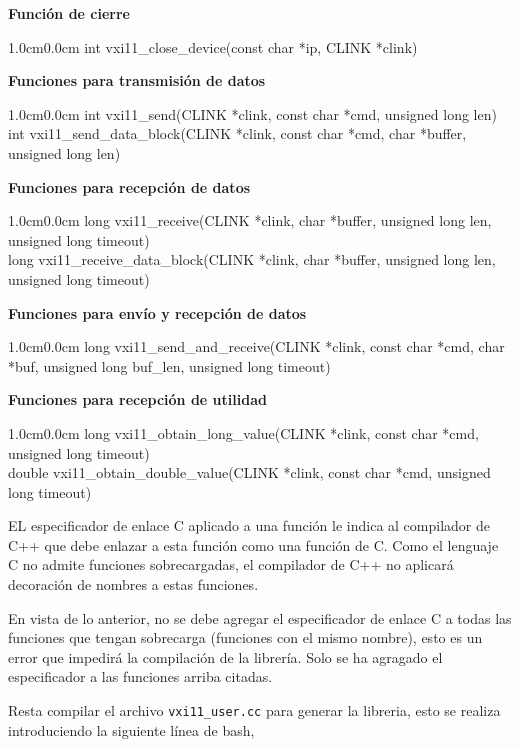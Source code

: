 \documentclass[paper=letter,oneside,fontsize=11pt, parskip=full]{scrartcl}
\newenvironment{code}
	{\begin{adjustwidth}{1.0cm}{0.0cm}\ttfamily}
	{\end{adjustwidth}}
\begin{document}
	\textbf{Función de cierre}
	\begin{code}
		int vxi11\_close\_device(const char *ip, CLINK *clink)
	\end{code}

	\textbf{Funciones para transmisión de datos}
	\begin{code}
		int	vxi11\_send(CLINK *clink, const char *cmd, unsigned long len) \\		
		int	vxi11\_send\_data\_block(CLINK *clink, const char *cmd, char *buffer, unsigned long len) 		 		
	\end{code}

	\textbf{Funciones para recepción de datos}
	\begin{code}
		long vxi11\_receive(CLINK *clink, char *buffer, unsigned long len, unsigned long timeout) \\	
		long vxi11\_receive\_data\_block(CLINK *clink, char *buffer, unsigned long len, unsigned long timeout) 			
	\end{code}		

	\textbf{Funciones para envío y recepción de datos}
	\begin{code}
		long vxi11\_send\_and\_receive(CLINK *clink, const char *cmd, char *buf, unsigned long buf\_len, unsigned long timeout) 
	\end{code}	
		
	\textbf{Funciones para recepción de utilidad}
	\begin{code}
		long vxi11\_obtain\_long\_value(CLINK *clink, const char *cmd, unsigned long timeout) \\
		double vxi11\_obtain\_double\_value(CLINK *clink, const char *cmd, unsigned long timeout)
	\end{code}

	EL especificador de enlace C aplicado a una función le indica al compilador de C++ que debe enlazar a esta función como una función de C. Como el lenguaje C no admite funciones sobrecargadas, el compilador de C++ no aplicará decoración de nombres a estas funciones. 
	
	En vista de lo anterior, no se debe agregar el especificador de enlace C a todas las funciones que tengan sobrecarga (funciones con el mismo nombre), esto es un error que impedirá la compilación de la librería. Solo se ha agragado el especificador a las funciones arriba citadas.
	
	Resta compilar el archivo \texttt{vxi11\_user.cc} para generar la libreria, esto se realiza introduciendo la siguiente línea de bash,
\end{document}
